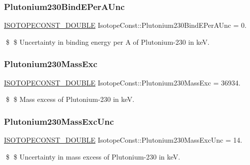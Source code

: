\subsubsection{\texorpdfstring{Plutonium230\+Bind\+E\+Per\+A\+Unc}{Plutonium230BindEPerAUnc}}
{\footnotesize\ttfamily \mbox{\hyperlink{group___isotope_const-_macros_ga8f45a7272ce02c0b4c65c44636ed719a}{I\+S\+O\+T\+O\+P\+E\+C\+O\+N\+S\+T\+\_\+\+D\+O\+U\+B\+LE}} Isotope\+Const\+::\+Plutonium230\+Bind\+E\+Per\+A\+Unc = 0.}

\$ \$ Uncertainty in binding energy per A of Plutonium-\/230 in keV. \mbox{\label{group___isotope_const-_plutonium-_pu230_ga4c363200604f0209339374c5243e689a}} 
\subsubsection{\texorpdfstring{Plutonium230\+Mass\+Exc}{Plutonium230MassExc}}
{\footnotesize\ttfamily \mbox{\hyperlink{group___isotope_const-_macros_ga8f45a7272ce02c0b4c65c44636ed719a}{I\+S\+O\+T\+O\+P\+E\+C\+O\+N\+S\+T\+\_\+\+D\+O\+U\+B\+LE}} Isotope\+Const\+::\+Plutonium230\+Mass\+Exc = 36934.}

\$ \$ Mass excess of Plutonium-\/230 in keV. \mbox{\label{group___isotope_const-_plutonium-_pu230_ga9dd05c4243da00c29fd0de6a9fd42a92}} 
\subsubsection{\texorpdfstring{Plutonium230\+Mass\+Exc\+Unc}{Plutonium230MassExcUnc}}
{\footnotesize\ttfamily \mbox{\hyperlink{group___isotope_const-_macros_ga8f45a7272ce02c0b4c65c44636ed719a}{I\+S\+O\+T\+O\+P\+E\+C\+O\+N\+S\+T\+\_\+\+D\+O\+U\+B\+LE}} Isotope\+Const\+::\+Plutonium230\+Mass\+Exc\+Unc = 14.}

\$ \$ Uncertainty in mass excess of Plutonium-\/230 in keV. \mbox{\label{group___isotope_const-_plutonium-_pu230_ga755effcb820c069e1fae4dcc7449efcd}} 
